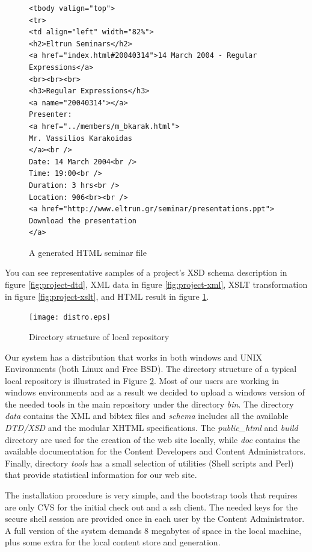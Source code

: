\documentclass[10pt]{article}
\begin{document}
\begin{figure}
\lstset{language=MYLANG,basicstyle=\ttfamily}
{\begin{lstlisting}
<tbody valign="top">
<tr>
<td align="left" width="82%">
<h2>Eltrun Seminars</h2>
<a href="index.html#20040314">14 March 2004 - Regular Expressions</a>
<br><br><br>
<h3>Regular Expressions</h3>
<a name="20040314"></a>
Presenter: 
<a href="../members/m_bkarak.html">
Mr. Vassilios Karakoidas
</a><br />
Date: 14 March 2004<br />
Time: 19:00<br />
Duration: 3 hrs<br />
Location: 906<br><br />
<a href="http://www.eltrun.gr/seminar/presentations.ppt">
Download the presentation
</a>
\end{lstlisting}}
\caption{A generated HTML seminar file}
\label{fig:project-html}
\end{figure}

You can see representative samples of a project's
{\sc XSD} schema description in figure \ref{fig:project-dtd},
{\sc XML} data in figure \ref{fig:project-xml},
XSLT transformation in figure \ref{fig:project-xslt},
and {\sc HTML} result in figure \ref{fig:project-html}.

\begin{figure}
\texttt{[image: distro.eps]}
\caption{Directory structure of local repository}
\label{fig:eltrun-web-distro}
\end{figure}

Our system has a distribution that works in both {\sc windows} and 
{\sc UNIX} Environments (both Linux and Free BSD). The directory structure of a typical 
local repository is illustrated in Figure \ref{fig:eltrun-web-distro}.
Most of our users are working in {\sc windows} environments and as 
a result we decided to upload a {\sc windows} version of the needed tools 
in the main repository under the directory \textit{bin}.
The directory \textit{data} contains the {\sc XML} and {\sc bibtex} files and \textit{schema}
includes all the available \textit{DTD/XSD} and the modular {\sc XHTML} specifications.
The \textit{public\_html} and \textit{build} directory are used for the creation of the 
web site locally, while \textit{doc} contains the available documentation for the Content Developers
and Content Administrators. Finally, directory \textit{tools} has a small selection 
of utilities (Shell scripts and {\sc Perl}) that provide statistical information
for our web site.

The installation procedure is very simple,
and the bootstrap tools that requires are only {\sc CVS} for 
the initial check out and a ssh client. The needed keys 
for the secure shell session are provided once in each user by the Content Administrator. 
A full version of the system demands 8 megabytes of space 
in the local machine, plus some extra for the local content store and generation.
\end{document}
